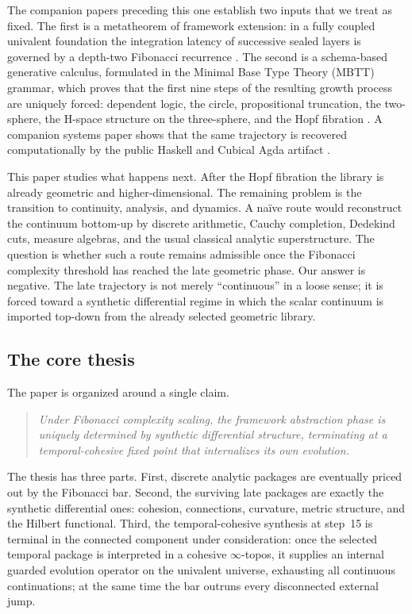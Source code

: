\documentclass[11pt]{article}
\theoremstyle{plain}
\theoremstyle{definition}
\theoremstyle{remark}
\begin{document}
The companion papers preceding this one establish two inputs that we treat as fixed. The first is a metatheorem of framework extension: in a fully coupled univalent foundation the integration latency of successive sealed layers is governed by a depth-two Fibonacci recurrence \citep{lande-coherence}. The second is a schema-based generative calculus, formulated in the Minimal Base Type Theory (MBTT) grammar, which proves that the first nine steps of the resulting growth process are uniquely forced: dependent logic, the circle, propositional truncation, the two-sphere, the H-space structure on the three-sphere, and the Hopf fibration \citep{lande-generative}. A companion systems paper shows that the same trajectory is recovered computationally by the public Haskell and Cubical Agda artifact \citep{lande-automation,lande-repo}.

This paper studies what happens next. After the Hopf fibration the library is already geometric and higher-dimensional. The remaining problem is the transition to continuity, analysis, and dynamics. A naïve route would reconstruct the continuum bottom-up by discrete arithmetic, Cauchy completion, Dedekind cuts, measure algebras, and the usual classical analytic superstructure. The question is whether such a route remains admissible once the Fibonacci complexity threshold has reached the late geometric phase. Our answer is negative. The late trajectory is not merely ``continuous'' in a loose sense; it is forced toward a synthetic differential regime in which the scalar continuum is imported top-down from the already selected geometric library.

\subsection{The core thesis}

The paper is organized around a single claim.

\begin{quote}
\emph{Under Fibonacci complexity scaling, the framework abstraction phase is uniquely determined by synthetic differential structure, terminating at a temporal-cohesive fixed point that internalizes its own evolution.}
\end{quote}

The thesis has three parts. First, discrete analytic packages are eventually priced out by the Fibonacci bar. Second, the surviving late packages are exactly the synthetic differential ones: cohesion, connections, curvature, metric structure, and the Hilbert functional. Third, the temporal-cohesive synthesis at step~15 is terminal in the connected component under consideration: once the selected temporal package is interpreted in a cohesive $\infty$-topos, it supplies an internal guarded evolution operator on the univalent universe, exhausting all continuous continuations; at the same time the bar outruns every disconnected external jump.
\end{document}
